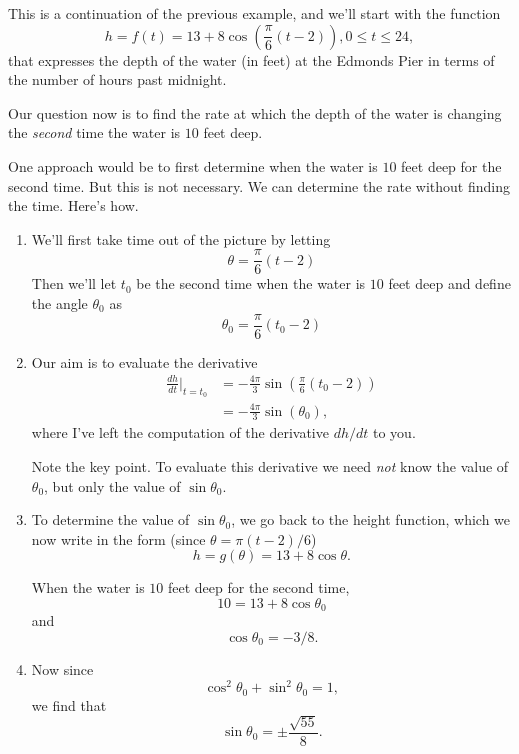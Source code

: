 \documentclass{ximera}
\begin{document}
\begin{example}  \label{Q4vdtggbghh}
This is a continuation of the previous example, and we'll start with the function
\[
   h  = f(t) = 13 + 8 \cos \left(  \frac{\pi}{6} \left( t - 2 \right) \right),  0\leq t \leq 24,
\]
that expresses the depth of the water (in feet) at the Edmonds Pier in terms of the number of hours past midnight.

Our question now is to find the rate at which the depth of the water is changing the \emph{second} time the water is $10$ feet deep. 

One approach would be to first determine when the water is $10$ feet deep for the second time. But this is not necessary. We can determine the rate without finding the time. Here's how.

\begin{enumerate}

\item We'll first take time out of the picture by letting
\[
   \theta = \frac{\pi}{6} \left( t - 2 \right)
\]
Then we'll let $t_0$ be the second time when the water is $10$ feet deep and define the angle $\theta_0$ as 
\[
   \theta_0 = \frac{\pi}{6} \left( t_0 - 2 \right)
\]

\item Our aim is to evaluate the derivative
\begin{align*}
  \frac{dh}{dt}\Big|_{t=t_0} &= -\frac{4\pi}{3} \sin\left( \frac{\pi}{6} \left( t_0 - 2 \right)   \right)   \\
                                          &= -\frac{4\pi}{3} \sin\left( \theta_0   \right) ,
\end{align*} 
where I've left the computation of the derivative $dh/dt$ to you.

Note the key point. To evaluate this derivative we need \emph{not} know the value of $\theta_0$, but only the value of $\sin\theta_0$.

\item To determine the value of $\sin\theta_0$, we go back to the height function, which we now write in the form (since $\theta = \pi(t-2)/6$)
\[
     h = g(\theta) = 13 + 8\cos \theta .
\]

When the water is $10$ feet deep for the second time,
\[
  10 = 13 + 8\cos \theta_0 
\]
and
\[
   \cos\theta_0 = -3/8 .
\]

\item Now since
\[
     \cos^2\theta_0 + \sin^2\theta_0 = 1 ,
\]
we find that
\[
    \sin\theta_0 = \pm \frac{\sqrt{55}}{8} .
\]


\end{enumerate}
\end{example}
\end{document}
